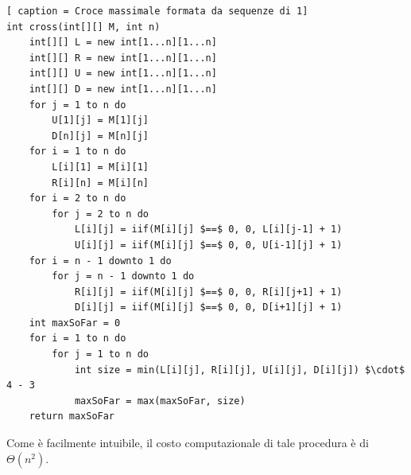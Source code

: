 \documentclass[../cheatSheetAlgoritmi.tex]{subfiles}
\begin{document}
\begin{lstlisting}[ caption = Croce massimale formata da sequenze di 1]
int cross(int[][] M, int n)
	int[][] L = new int[1...n][1...n]
	int[][] R = new int[1...n][1...n]
	int[][] U = new int[1...n][1...n]
	int[][] D = new int[1...n][1...n]
	for j = 1 to n do
		U[1][j] = M[1][j]
		D[n][j] = M[n][j]
	for i = 1 to n do
		L[i][1] = M[i][1]
		R[i][n] = M[i][n]
	for i = 2 to n do
		for j = 2 to n do
			L[i][j] = iif(M[i][j] $==$ 0, 0, L[i][j-1] + 1)
			U[i][j] = iif(M[i][j] $==$ 0, 0, U[i-1][j] + 1)
	for i = n - 1 downto 1 do
		for j = n - 1 downto 1 do
			R[i][j] = iif(M[i][j] $==$ 0, 0, R[i][j+1] + 1)
			D[i][j] = iif(M[i][j] $==$ 0, 0, D[i+1][j] + 1)
	int maxSoFar = 0
	for i = 1 to n do
		for j = 1 to n do
			int size = min(L[i][j], R[i][j], U[i][j], D[i][j]) $\cdot$ 4 - 3
			maxSoFar = max(maxSoFar, size)
	return maxSoFar
\end{lstlisting}
Come è facilmente intuibile, il costo computazionale di tale procedura è di $\Theta(n^2)$.
\end{document}
